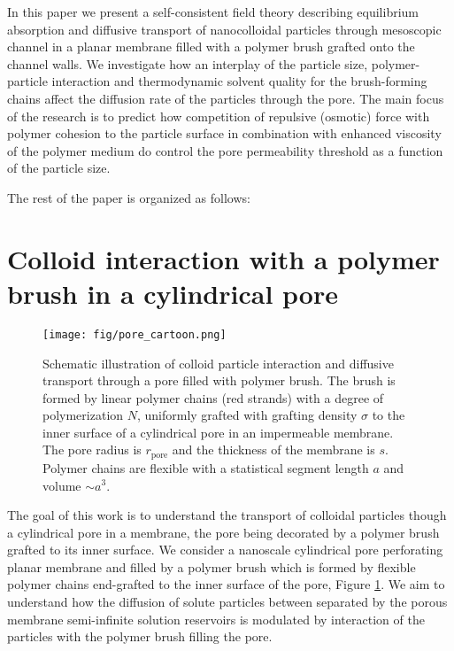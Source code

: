 \documentclass[12pt, a4paper]{article}
\begin{document}
In this paper we present a self-consistent field theory describing equilibrium absorption and diffusive transport of nanocolloidal particles
through mesoscopic channel in a planar membrane filled with a polymer brush grafted onto the channel walls. We investigate how an interplay of the particle size,
polymer-particle interaction and thermodynamic solvent quality for the brush-forming chains affect the diffusion rate of the particles through the pore. 
The main focus of the research is to predict how competition of repulsive (osmotic) force with polymer cohesion to the particle surface in combination with
enhanced viscosity of the polymer medium do control the  pore permeability threshold as a function of the particle size.


The rest of the paper is organized as follows: 



\section{Colloid interaction with a polymer brush in a cylindrical pore}


\begin{figure}
    \centering
    \texttt{[image: fig/pore\_cartoon.png]}
    \caption{
        Schematic illustration of colloid particle interaction and diffusive transport through a pore filled with polymer brush. 
        The brush is formed by linear polymer chains (red strands) with a degree of polymerization $N$, uniformly grafted with grafting density $\sigma$  
        to the inner surface of a cylindrical pore in an impermeable membrane. The pore radius is $r_{\textrm{pore}}$ and the thickness of the membrane is $s$.
        Polymer chains are flexible with a statistical segment length $a$ and volume $\sim a^3$.
}
    \label{fig:colloid_transport}
\end{figure}

The goal of this work is to understand the transport of colloidal particles though a cylindrical pore in a membrane, the pore being decorated by a polymer brush grafted to its inner surface. 
We consider a nanoscale cylindrical pore perforating planar membrane and filled by a polymer brush which is formed  
by flexible polymer chains end-grafted to the inner surface of the pore, Figure \ref{fig:colloid_transport}. 
We aim to understand how the diffusion of solute particles between separated by the porous
membrane semi-infinite solution reservoirs is modulated by interaction of the particles with the 
polymer brush filling the pore.
\end{document}
